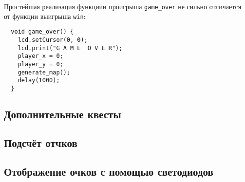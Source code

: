 \documentclass[../sparc.tex]{subfiles}
\begin{document}
Простейшая реализация функциии проигрыша \texttt{game\_over} не сильно
отличается от функции выигрыша \texttt{win}:

\begin{verbatim}
  void game_over() {
    lcd.setCursor(0, 0);
    lcd.print("G A M E  O V E R");
    player_x = 0;
    player_y = 0;
    generate_map();
    delay(1000);
  }
\end{verbatim}

\subsection{Дополнительные квесты}

\subsection{Подсчёт отчков}

\subsection{Отображение очков с помощью светодиодов}
\end{document}

